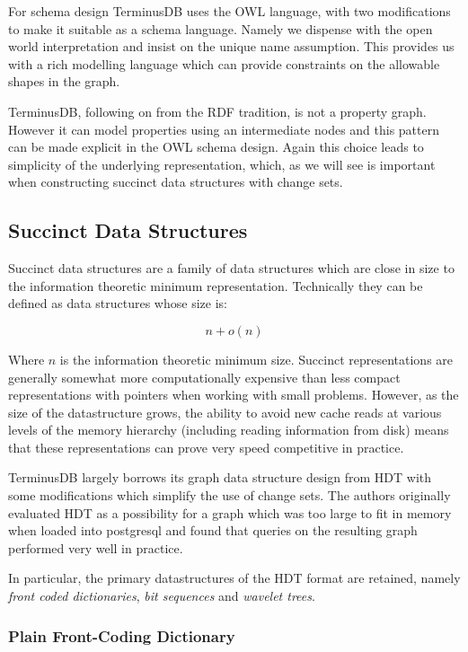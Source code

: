 \documentclass[10pt, a4paper, twocolumn]{article} %
\begin{document}
For schema design TerminusDB uses the OWL language, with two
modifications to make it suitable as a schema language. Namely we
dispense with the open world interpretation and insist on the unique
name assumption\cite{DBLP:journals/semweb/FeeneyMB18}. This provides
us with a rich modelling language which can provide constraints on the
allowable shapes in the graph.

TerminusDB, following on from the RDF tradition, is not a property
graph. However it can model properties using an intermediate nodes and
this pattern can be made explicit in the OWL schema design. Again this
choice leads to simplicity of the underlying representation, which, as
we will see is important when constructing succinct data structures
with change sets.

\subsection{Succinct Data Structures}

Succinct data structures\cite{Jacobson:1988:SSD:915547} are a family of
data structures which are close in size to the information theoretic
minimum representation. Technically they can be defined as data structures
whose size is:

\[ n + o(n) \]

Where \(n\) is the information theoretic minimum size. Succinct
representations are generally somewhat more computationally expensive
than less compact representations with pointers when working with
small problems. However, as the size of the datastructure grows, the
ability to avoid new cache reads at various levels of the memory
hierarchy (including reading information from disk) means that these
representations can prove very speed
competitive\cite{doi:10.1002/spe.2198} in practice.

TerminusDB largely borrows its graph data structure design from
HDT\cite{10.1007/978-3-642-30284-8_36} with some modifications which
simplify the use of change sets. The authors originally evaluated HDT
as a possibility for a graph which was too large to fit in memory when
loaded into postgresql and found that queries on the resulting graph
performed very well in practice.

In particular, the primary datastructures of the HDT format are
retained, namely {\em front coded dictionaries}, {\em bit sequences}
and {\em wavelet trees}.

\subsubsection{Plain Front-Coding Dictionary}
\end{document}
